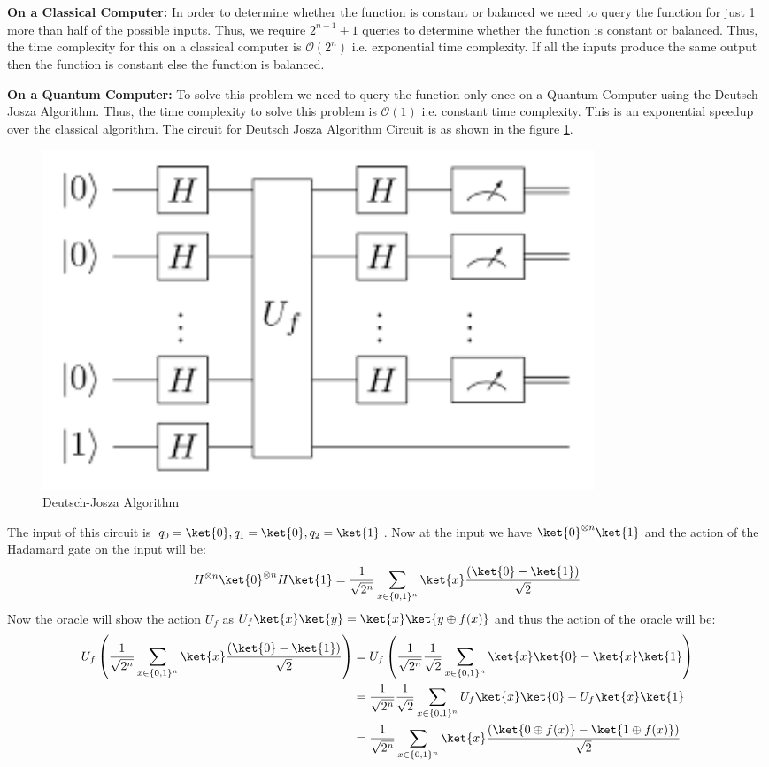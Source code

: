 \documentclass[12pt, oneside]{book}
\theoremstyle{definition}
\theoremstyle{definition}
\theoremstyle{remark}
\begin{document}
\textbf{On a Classical Computer: }In order to determine whether the function is constant or balanced we need to query the function
for just 1 more than half of the possible inputs. Thus, we require $2^{n-1}+1$ queries to determine whether the function is constant or balanced.
Thus, the time complexity for this on a classical computer is $\mathcal{O}(2^n)$ i.e. exponential time complexity. If all the inputs produce the same output then the function is constant else the function is balanced.

\textbf{On a Quantum Computer: }To solve this problem we need to query the function only once on a Quantum Computer using the Deutsch-Josza Algorithm.
Thus, the time complexity to solve this problem is $\mathcal{O}(1)$ i.e. constant time complexity. This is an exponential speedup over the classical algorithm. The circuit for 
Deutsch Josza Algorithm Circuit is as shown in the figure \ref{fig:deutsch-jozsa}.
\begin{figure}[H]
    \centering
    \includegraphics[width=0.8\textwidth]{../images/Deutsch-Jozsa.png}
    \caption{Deutsch-Josza Algorithm}
    \label{fig:deutsch-jozsa}
\end{figure}
The input of this circuit is $q_0=\ket{0},q_1=\ket{0},q_2=\ket{1}$.
Now at the input we have $\ket{0}^{\otimes n}\ket{1}$ and the action of the Hadamard gate on the input will be:
\[
    H^{\otimes n}\ket{0}^{\otimes n}H\ket{1}=\frac{1}{\sqrt{2^n}}\sum_{x \in \{0,1\}^n}\ket{x}\frac{(\ket{0}-\ket{1})}{\sqrt{2}}
\]
Now the oracle will show the action $U_f$ as $U_f\ket{x}\ket{y}=\ket{x}\ket{y \oplus f(x)}$ and thus the action of the oracle will be:
\begin{align*}
    U_f\left(\frac{1}{\sqrt{2^n}}\sum_{x \in \{0,1\}^n}\ket{x}\frac{(\ket{0}-\ket{1})}{\sqrt{2}}\right)&=U_f\left(\frac{1}{\sqrt{2^n}}\frac{1}{\sqrt{2}}\sum_{x \in \{0,1\}^n}\ket{x}\ket{0}-\ket{x}\ket{1}\right)\\
    &=\frac{1}{\sqrt{2^n}}\frac{1}{\sqrt{2}}\sum_{x \in \{0,1\}^n}U_f\ket{x}\ket{0}-U_f\ket{x}\ket{1}\\
    &=\frac{1}{\sqrt{2^n}}\sum_{x \in \{0,1\}^n}\ket{x}\frac{(\ket{0 \oplus f(x)}-\ket{1\oplus f(x)})}{\sqrt{2}}
\end{align*}
\end{document}
